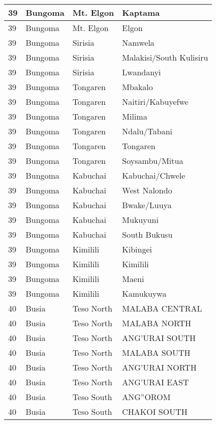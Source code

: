 \begin{table}[!ht]
\begin{tabular}{|l|l|l|l|}
        39 & Bungoma & Mt. Elgon & Kaptama \\ \hline
        39 & Bungoma & Mt. Elgon & Elgon \\ \hline
        39 & Bungoma & Sirisia & Namwela \\ \hline
        39 & Bungoma & Sirisia & Malakisi/South Kulisiru \\ \hline
        39 & Bungoma & Sirisia & Lwandanyi \\ \hline
        39 & Bungoma & Tongaren & Mbakalo \\ \hline
        39 & Bungoma & Tongaren & Naitiri/Kabuyefwe \\ \hline
        39 & Bungoma & Tongaren & Milima \\ \hline
        39 & Bungoma & Tongaren & Ndalu/Tabani \\ \hline
        39 & Bungoma & Tongaren & Tongaren \\ \hline
        39 & Bungoma & Tongaren & Soysambu/Mitua \\ \hline
        39 & Bungoma & Kabuchai & Kabuchai/Chwele \\ \hline
        39 & Bungoma & Kabuchai & West Nalondo \\ \hline
        39 & Bungoma & Kabuchai & Bwake/Luuya \\ \hline
        39 & Bungoma & Kabuchai & Mukuyuni \\ \hline
        39 & Bungoma & Kabuchai & South Bukusu \\ \hline
        39 & Bungoma & Kimilili & Kibingei \\ \hline
        39 & Bungoma & Kimilili & Kimilili \\ \hline
        39 & Bungoma & Kimilili & Maeni \\ \hline
        39 & Bungoma & Kimilili & Kamukuywa \\ \hline
        40 & Busia & Teso North & MALABA CENTRAL \\ \hline
        40 & Busia & Teso North & MALABA NORTH \\ \hline
        40 & Busia & Teso North & ANG’URAI SOUTH \\ \hline
        40 & Busia & Teso North & MALABA SOUTH \\ \hline
        40 & Busia & Teso North & ANG’URAI NORTH \\ \hline
        40 & Busia & Teso North & ANG’URAI EAST \\ \hline
        40 & Busia & Teso South & ANG''OROM \\ \hline
        40 & Busia & Teso South & CHAKOI SOUTH \\ \hline

\end{tabular}
\end{table}
